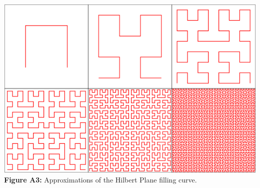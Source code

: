 \documentclass[twoside]{article}
\begin{document}
\vspace{1em}
\begin{center}
\includegraphics[scale=0.55]{hilbert_curve}\\
\textbf{Figure A3: } Approximations of the Hilbert Plane filling curve.
\end{center}
\end{document}
